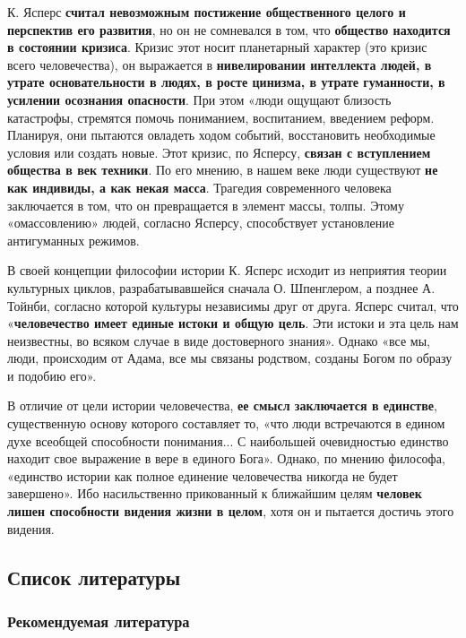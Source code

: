 \documentclass{article}
\begin{document}
\begin{flushleft}
\hfill

К. Ясперс \textbf{считал невозможным постижение общественного целого и перспектив его развития}, но он не сомневался в том, что \textbf{общество находится в состоянии кризиса}. Кризис этот носит планетарный характер (это кризис всего человечества), он выражается в \textbf{нивелировании интеллекта людей, в утрате основательности в людях, в росте цинизма, в утрате гуманности, в усилении осознания опасности}. При этом «люди ощущают близость катастрофы, стремятся помочь пониманием, воспитанием, введением реформ. Планируя, они пытаются овладеть ходом событий, восстановить необходимые условия или создать новые. Этот кризис, по Ясперсу, \textbf{связан с вступлением общества в век техники}. По его мнению, в нашем веке люди существуют \textbf{не как индивиды, а как некая масса}. Трагедия современного человека заключается в том, что он превращается в элемент массы, толпы. Этому «омассовлению» людей, согласно Ясперсу, способствует установление антигуманных режимов.

\hfill

В своей концепции философии истории К. Ясперс исходит из неприятия теории культурных циклов, разрабатывавшейся сначала О. Шпенглером, а позднее А. Тойнби, согласно которой культуры независимы друг от друга. Ясперс считал, что «\textbf{человечество имеет единые истоки и общую цель}. Эти истоки и эта цель нам неизвестны, во всяком случае в виде достоверного знания». Однако «все мы, люди, происходим от Адама, все мы связаны родством, созданы Богом по образу и подобию его».

\hfill

В отличие от цели истории человечества, \textbf{ее смысл заключается в единстве}, существенную основу которого составляет то, «что люди встречаются в едином духе всеобщей способности понимания... С наибольшей очевидностью единство находит свое выражение в вере в единого Бога». Однако, по мнению философа, «единство истории как полное единение человечества никогда не будет завершено». Ибо насильственно прикованный к ближайшим целям \textbf{человек лишен способности видения жизни в целом}, хотя он и пытается достичь этого видения.

\end{flushleft}


\subsection{Список литературы}

\subsubsection{Рекомендуемая литература}
\end{document}
